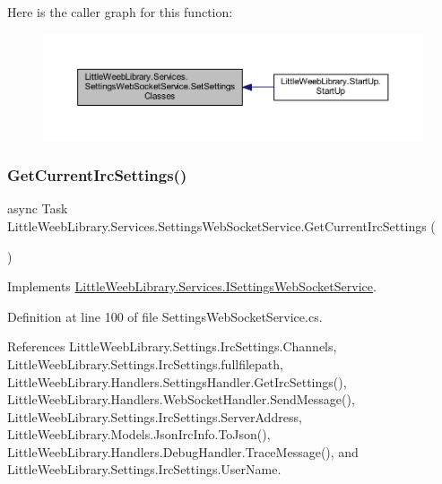 Here is the caller graph for this function\+:\nopagebreak
\begin{figure}[H]
\begin{center}
\leavevmode
\includegraphics[width=350pt]{class_little_weeb_library_1_1_services_1_1_settings_web_socket_service_af799e00c29f6eec4ca8874cda559c225_icgraph}
\end{center}
\end{figure}
\mbox{\label{class_little_weeb_library_1_1_services_1_1_settings_web_socket_service_aaa29fbcae1268174d436730a58afadca}} 
\subsubsection{\texorpdfstring{Get\+Current\+Irc\+Settings()}{GetCurrentIrcSettings()}}
{\footnotesize\ttfamily async Task Little\+Weeb\+Library.\+Services.\+Settings\+Web\+Socket\+Service.\+Get\+Current\+Irc\+Settings (\begin{DoxyParamCaption}{ }\end{DoxyParamCaption})}



Implements \mbox{\hyperlink{interface_little_weeb_library_1_1_services_1_1_i_settings_web_socket_service_ab23ceb6d97191ccdbef5584caa1964a1}{Little\+Weeb\+Library.\+Services.\+I\+Settings\+Web\+Socket\+Service}}.



Definition at line 100 of file Settings\+Web\+Socket\+Service.\+cs.



References Little\+Weeb\+Library.\+Settings.\+Irc\+Settings.\+Channels, Little\+Weeb\+Library.\+Settings.\+Irc\+Settings.\+fullfilepath, Little\+Weeb\+Library.\+Handlers.\+Settings\+Handler.\+Get\+Irc\+Settings(), Little\+Weeb\+Library.\+Handlers.\+Web\+Socket\+Handler.\+Send\+Message(), Little\+Weeb\+Library.\+Settings.\+Irc\+Settings.\+Server\+Address, Little\+Weeb\+Library.\+Models.\+Json\+Irc\+Info.\+To\+Json(), Little\+Weeb\+Library.\+Handlers.\+Debug\+Handler.\+Trace\+Message(), and Little\+Weeb\+Library.\+Settings.\+Irc\+Settings.\+User\+Name.



